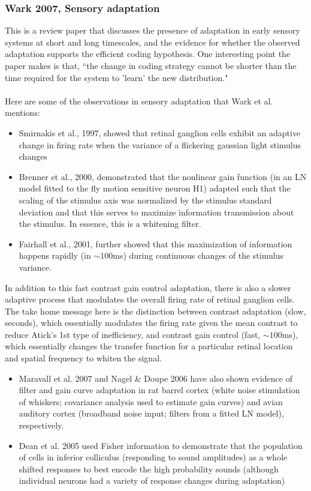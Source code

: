 \documentclass{article}
\begin{document}
\subsubsection{Wark 2007, Sensory adaptation}
This is a review paper that discusses the presence of adaptation in early sensory systems at short and long timescales, and the evidence for whether the observed adaptation supports the efficient coding hypothesis.  One interesting point the paper makes is that, ``the change in coding strategy cannot be shorter than the time required for the system to 'learn' the new distribution."\\
\\
Here are some of the observations in sensory adaptation that Wark et al. mentions:
\begin{itemize}
\item Smirnakis et al., 1997, showed that retinal ganglion cells exhibit an adaptive change in firing rate when the variance of a flickering gaussian light stimulus changes
\item Brenner et al., 2000, demonstrated that the nonlinear gain function (in an LN model fitted to the fly motion sensitive neuron H1) adapted such that the scaling of the stimulus axis was normalized by the stimulus standard deviation and that this serves to maximize information transmission about the stimulus.  In essence, this is a whitening filter.
\item Fairhall et al., 2001, further showed that this maximization of information happens rapidly (in $\sim 100$ms) during continuous changes of the stimulus variance.
\end{itemize}
In addition to this fast contrast gain control adaptation, there is also a slower adaptive process that modulates the overall firing rate of retinal ganglion cells.  The take home message here is the distinction between contrast adaptation (slow, seconds), which essentially modulates the firing rate given the mean contrast to reduce Atick's 1st type of inefficiency, and contrast gain control (fast, $\sim 100$ms), which essentially changes the transfer function for a particular retinal location and spatial frequency to whiten the signal.
\begin{itemize}
\item Maravall et al. 2007 and Nagel \& Doupe 2006 have also shown evidence of filter and gain curve adaptation in rat barrel cortex (white noise stimulation of whiskers; covariance analysis used to estimate gain curves) and avian auditory cortex (broadband noise input; filters from a fitted LN model), respectively.
\item Dean et al. 2005 used Fisher information to demonstrate that the population of cells in inferior colliculus (responding to sound amplitudes) as a whole shifted responses to best encode the high probability sounds (although individual neurons had a variety of response changes during adaptation)
\end{itemize}
\end{document}
